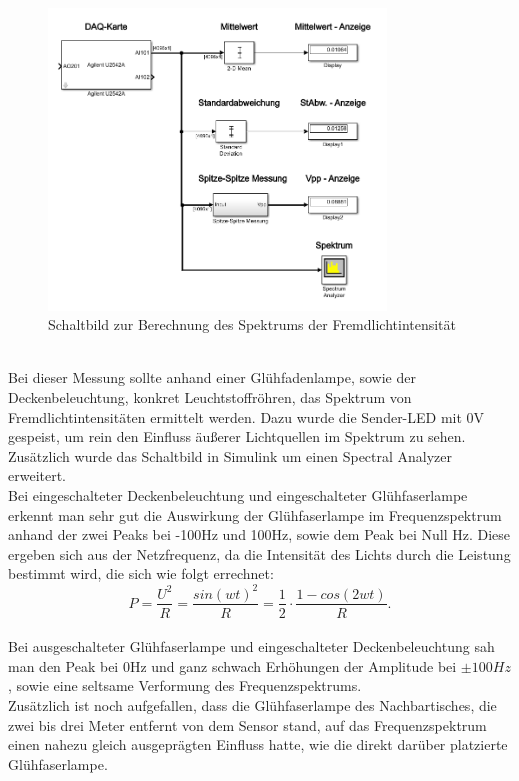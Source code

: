\begin{figure}[h]
	\centering
	\includegraphics[width=0.8\textwidth]{./img/ch6/6_3_4}
	\caption{Schaltbild zur Berechnung des Spektrums der Fremdlichtintensität}
	\label{fg:schalt_spek}
\end{figure}
~\\
Bei dieser Messung sollte anhand einer Glühfadenlampe, sowie der Deckenbeleuchtung, konkret Leuchtstoffröhren, das Spektrum von Fremdlichtintensitäten ermittelt werden. Dazu wurde die Sender-LED mit 0V gespeist, um rein den Einfluss äußerer Lichtquellen im Spektrum zu sehen. Zusätzlich wurde das Schaltbild in Simulink um einen Spectral Analyzer erweitert.
~\\
Bei eingeschalteter Deckenbeleuchtung und eingeschalteter Glühfaserlampe erkennt man sehr gut die Auswirkung der Glühfaserlampe im Frequenzspektrum anhand der zwei Peaks bei -100Hz und 100Hz, sowie dem Peak bei Null Hz. Diese ergeben sich aus der Netzfrequenz, da die Intensität des Lichts durch die Leistung bestimmt wird, die sich wie folgt errechnet:
\begin{equation}
	 P = \dfrac{U^2}{R} = \dfrac{sin(wt)^2}{R} = \dfrac{1}{2} \cdot \dfrac{1 - cos(2wt)}{R}.
\end{equation}
~\\
Bei ausgeschalteter Glühfaserlampe und eingeschalteter Deckenbeleuchtung sah man den Peak bei 0Hz und ganz schwach Erhöhungen der Amplitude bei $\pm 100Hz$, sowie eine seltsame Verformung des Frequenzspektrums.
~\\
Zusätzlich ist noch aufgefallen, dass die Glühfaserlampe des Nachbartisches, die zwei bis drei Meter entfernt von dem Sensor stand, auf das Frequenzspektrum einen nahezu gleich ausgeprägten Einfluss hatte, wie die direkt darüber platzierte Glühfaserlampe.
